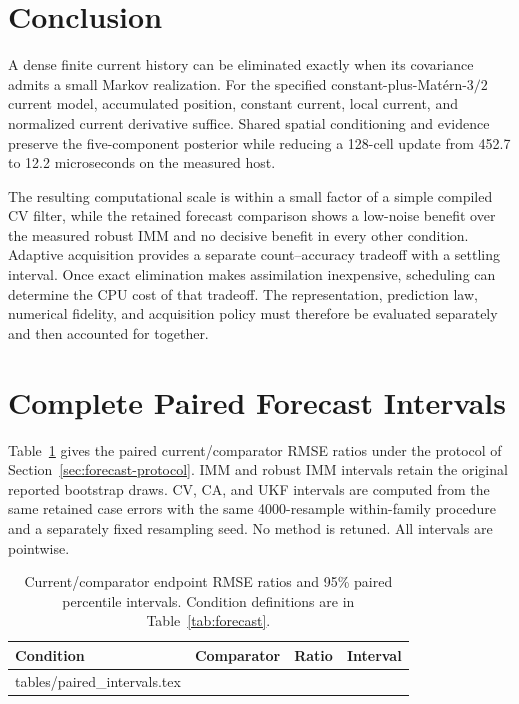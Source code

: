 \documentclass[journal]{IEEEtran}
\makeatletter
\newcommand{\inputrows}[1]{\@@input #1 }
\makeatother
\begin{document}
\section{Conclusion}

A dense finite current history can be eliminated exactly when its
covariance admits a small Markov realization. For the specified
constant-plus-Mat\'ern-$3/2$ current model, accumulated position,
constant current, local current, and normalized current derivative
suffice. Shared spatial conditioning and evidence preserve the
five-component posterior while reducing a 128-cell update from
452.7 to 12.2 microseconds on the measured host.

The resulting computational scale is within a small factor of a simple
compiled CV filter, while the retained forecast comparison shows a
low-noise benefit over the measured robust IMM and no decisive benefit
in every other condition. Adaptive acquisition provides a separate
count--accuracy tradeoff with a settling interval. Once exact elimination
makes assimilation inexpensive, scheduling can determine the CPU cost
of that tradeoff. The representation, prediction law, numerical fidelity,
and acquisition policy must therefore be evaluated separately and then
accounted for together.

\appendices
\section{Complete Paired Forecast Intervals}
\label{app:intervals}

Table~\ref{tab:all-ci} gives the paired current/comparator RMSE ratios
under the protocol of Section~\ref{sec:forecast-protocol}. IMM and robust
IMM intervals retain the original reported bootstrap draws. CV, CA,
and UKF intervals are computed from the same retained case errors with
the same 4000-resample within-family procedure and a separately fixed
resampling seed. No method is retuned. All intervals are pointwise.

\begin{table}[h]
\centering
\caption{Current/comparator endpoint RMSE ratios and 95\% paired
percentile intervals. Condition definitions are in Table~\ref{tab:forecast}.}
\label{tab:all-ci}
\small
\begin{tabular}{llrr}
\toprule Condition & Comparator & Ratio & Interval\\\midrule
\inputrows{tables/paired_intervals.tex}
\bottomrule
\end{tabular}
\end{table}
\end{document}
